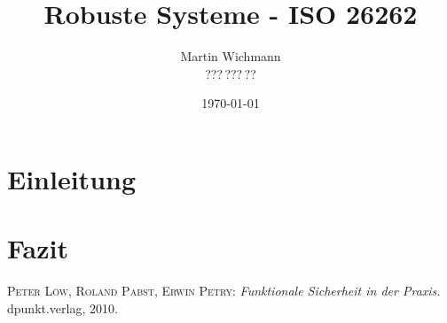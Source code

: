 \documentclass[a4paper,DIV=calc,ngerman]{scrartcl}
\begin{document}
\titlehead{}
\title{Robuste Systeme - ISO 26262}
\author{Martin Wichmann\\???\,???\,??}
\date{\today}

\maketitle
\tableofcontents

\thispagestyle{empty}

\newpage
\setcounter{page}{1}

% 
\section{Einleitung}
\label{sec:Einleitung}


% 
\section{Fazit}
\label{sec:Fazit}


\begin{thebibliography}{------}
\label{sec:Literatur}

 \textsc{Peter Löw, Roland Pabst, Erwin Petry}: {\em Funktionale Sicherheit in der Praxis.} dpunkt.verlag, 2010.

\end{thebibliography}
\end{document}
